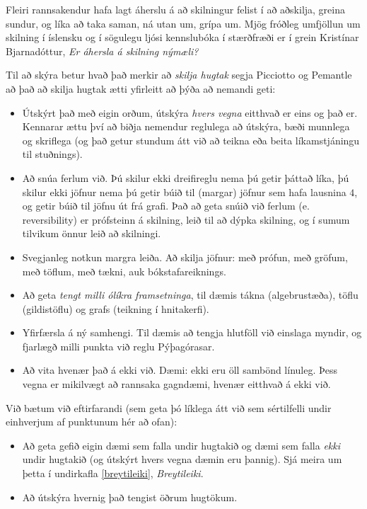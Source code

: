\documentclass[
  icelandic,
]{book}
\providecommand{\tightlist}{%
  \setlength{\itemsep}{0pt}\setlength{\parskip}{0pt}}
\begin{document}
Fleiri rannsakendur hafa lagt áherslu á að skilningur felist í að aðskilja, greina sundur, og líka að taka saman, ná utan um, grípa um. Mjög fróðleg umfjöllun um skilning í íslensku og í sögulegu ljósi kennslubóka í stærðfræði er í grein Kristínar Bjarnadóttur, \emph{Er áhersla á skilning nýmæli?} \autocite{bjarnadottir2022}

Til að skýra betur hvað það merkir að \emph{skilja hugtak} segja Picciotto og Pemantle að það að skilja hugtak ætti yfirleitt að þýða að nemandi geti:

\begin{itemize}
\tightlist
\item
  Útskýrt það með eigin orðum, útskýra \emph{hvers vegna} eitthvað er eins og það er. Kennarar ættu því að biðja nemendur reglulega að útskýra, bæði munnlega og skriflega (og það getur stundum átt við að teikna eða beita líkamstjáningu til stuðnings).
\item
  Að snúa ferlum við. Þú skilur ekki dreifireglu nema þú getir þáttað líka, þú skilur ekki jöfnur nema þú getir búið til (margar) jöfnur sem hafa lausnina \(4\), og getir búið til jöfnu út frá grafi. Það að geta snúið við ferlum (e. reversibility) er prófsteinn á skilning, leið til að dýpka skilning, og í sumum tilvikum önnur leið að skilningi.
\item
  Svegjanleg notkun margra leiða. Að skilja jöfnur: með prófun, með gröfum, með töflum, með tækni, auk bókstafareiknings.
\item
  Að geta \emph{tengt milli ólíkra framsetninga}, til dæmis tákna (algebrustæða), töflu (gildistöflu) og grafs (teikning í hnitakerfi).
\item
  Yfirfærsla á ný samhengi. Til dæmis að tengja hlutföll við einslaga myndir, og fjarlægð milli punkta við reglu Pýþagórasar.
\item
  Að vita hvenær það á ekki við. Dæmi: ekki eru öll sambönd línuleg. Þess vegna er mikilvægt að rannsaka gagndæmi, hvenær eitthvað á ekki við.
\end{itemize}

Við bætum við eftirfarandi (sem geta þó líklega átt við sem sértilfelli undir einhverjum af punktunum hér að ofan):

\begin{itemize}
\tightlist
\item
  Að geta gefið eigin dæmi sem falla undir hugtakið og dæmi sem falla \emph{ekki} undir hugtakið (og útskýrt hvers vegna dæmin eru þannig). Sjá meira um þetta í undirkafla \ref{breytileiki}, \emph{Breytileiki}.
\item
  Að útskýra hvernig það tengist öðrum hugtökum.
\end{itemize}
\end{document}
